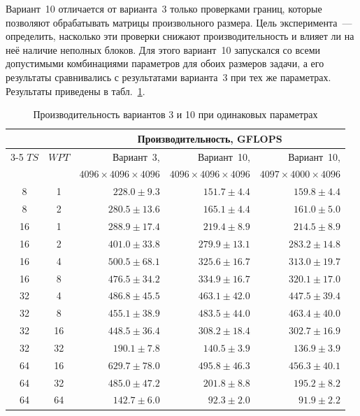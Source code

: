 \documentclass[a4paper]{article}
\begin{document}
Вариант~10 отличается от варианта~3 только проверками границ, которые
позволяют обрабатывать матрицы произвольного размера. Цель
эксперимента~--- определить, насколько эти проверки снижают
производительность и влияет ли на неё наличие неполных блоков. Для
этого вариант~10 запускался со всеми допустимыми комбинациями
параметров для обоих размеров задачи, а его результаты сравнивались с
результатами варианта~3 при тех же параметрах. Результаты приведены в
табл.~\ref{tab:v10}.

\begin{table}[h!]
\centering
\caption{Производительность вариантов 3 и 10 при одинаковых параметрах}
\label{tab:v10}
\begin{tabular}{c c r r r}
\toprule
 & & \multicolumn{3}{c}{Производительность, GFLOPS} \\
\cmidrule(lr){3-5}
$TS$ & $WPT$ & Вариант~3, & Вариант~10, & Вариант~10, \\
 & & $4096 \times 4096 \times 4096$ & $4096 \times 4096 \times 4096$ & $4097 \times 4000 \times 4096$ \\
\midrule
8  & 1  & $228.0 \pm 9.3$  & $151.7 \pm 4.4$  & $159.8 \pm 4.4$  \\
8  & 2  & $280.5 \pm 13.6$ & $165.1 \pm 4.4$  & $161.0 \pm 5.0$  \\
16 & 1  & $288.9 \pm 17.4$ & $219.4 \pm 8.9$  & $214.5 \pm 8.9$  \\
16 & 2  & $401.0 \pm 33.8$ & $279.9 \pm 13.1$ & $283.2 \pm 14.8$ \\
16 & 4  & $500.5 \pm 68.1$ & $325.6 \pm 16.7$ & $313.0 \pm 19.7$ \\
16 & 8  & $476.5 \pm 34.2$ & $334.9 \pm 16.7$ & $320.1 \pm 17.0$ \\
32 & 4  & $486.8 \pm 45.5$ & $463.1 \pm 42.0$ & $447.5 \pm 39.4$ \\
32 & 8  & $455.1 \pm 38.9$ & $483.5 \pm 44.0$ & $463.4 \pm 40.0$ \\
32 & 16 & $448.5 \pm 36.4$ & $308.2 \pm 18.4$ & $302.7 \pm 16.9$ \\
32 & 32 & $190.1 \pm 7.8$  & $140.5 \pm 3.9$  & $136.9 \pm 3.9$  \\
64 & 16 & $629.7 \pm 78.0$ & $495.8 \pm 46.3$ & $456.3 \pm 40.1$ \\
64 & 32 & $485.0 \pm 47.2$ & $201.8 \pm 8.8$  & $195.2 \pm 8.2$  \\
64 & 64 & $142.7 \pm 6.0$  & $92.3 \pm 2.0$   & $91.9 \pm 2.2$   \\
\bottomrule
\end{tabular}
\end{table}
\end{document}
